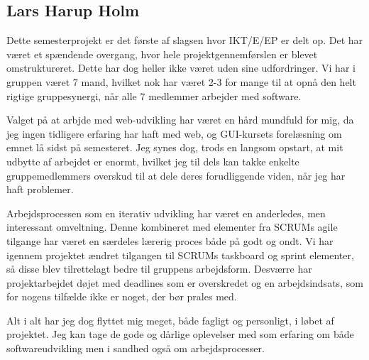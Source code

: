 \subsection*{Lars Harup Holm}
Dette semesterprojekt er det første af slagsen hvor IKT/E/EP er delt op. Det har været et spændende overgang, hvor hele projektgennemførslen er blevet omstruktureret. Dette har dog heller ikke været uden sine udfordringer. Vi har i gruppen været 7 mand, hvilket nok har været 2-3 for mange til at opnå den helt rigtige gruppesynergi, når alle 7 medlemmer arbejder med software.

Valget på at arbjde med web-udvikling har været en hård mundfuld for mig, da jeg ingen tidligere erfaring har haft med web, og  GUI-kursets forelæsning om emnet lå sidst på semesteret. Jeg synes dog, trods en langsom opstart, at mit udbytte af arbejdet er enormt, hvilket jeg til dels kan takke enkelte gruppemedlemmers overskud til at dele deres forudliggende viden, når jeg har haft problemer.

Arbejdsprocessen som en iterativ udvikling har været en anderledes, men interessant omveltning. Denne kombineret med elementer fra SCRUMs agile tilgange har været en særdeles lærerig proces både på godt og ondt. Vi har igennem projektet ændret tilgangen til SCRUMs taskboard og sprint elementer, så disse blev tilrettelagt bedre til gruppens arbejdsform. Desværre  har projektarbejdet døjet med deadlines som er overskredet og en arbejdsindsats, som for nogens tilfælde ikke er noget, der bør prales med. 

Alt i alt har jeg dog flyttet mig meget, både fagligt og personligt, i løbet af projektet. Jeg kan tage de gode og dårlige oplevelser med som erfaring om både softwareudvikling men i sandhed også om arbejdsprocesser.